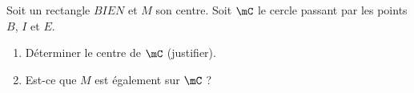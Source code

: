 
\begin{exercice}\label{exo2smath-0305}

    Soit un rectangle \( BIEN\) et \( M\) son centre. Soit \( \mC\) le cercle passant par les points \( B\), \( I\) et \( E\).
    \begin{enumerate}
        \item
            Déterminer le centre de \( \mC\) (justifier).
        \item
            Est-ce que \( M\) est également sur \( \mC\) ?
    \end{enumerate}

\end{exercice}
